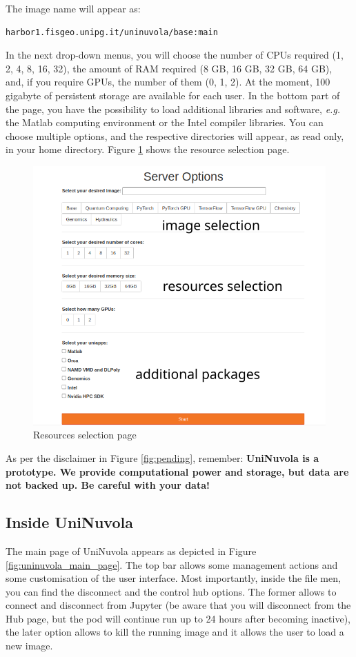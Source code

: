 The image name will appear as:
\begin{lstlisting}[language=bash] 
harbor1.fisgeo.unipg.it/uninuvola/base:main
\end{lstlisting}

In the next drop-down menus, you will choose the number of CPUs required (1, 2, 4, 8, 16, 32), the amount of RAM
required (8 GB, 16 GB, 32 GB, 64 GB), and, if you require GPUs, the number of them (0, 1, 2). At the moment, 100
gigabyte of persistent storage are available for each user. In the bottom part of the page, you have the possibility to load additional libraries and software, \textit{e.g.} the Matlab computing environment or the Intel compiler libraries. You can choose multiple options, and the respective directories will appear, as read only, in your home directory. Figure \ref{fig:resources} shows the resource selection page.\\

\begin{figure}[!ht]
    \centering
    \includegraphics[width=0.75\linewidth]{img/resource_selection.png}
    \caption{Resources selection page}
    \label{fig:resources}
\end{figure}

As per the disclaimer in Figure \ref{fig:pending}, remember: \textbf{UniNuvola is a prototype. We provide computational
    power and storage, but data are not backed up. Be careful with your data!} \\

\subsection{Inside UniNuvola}
The main page of UniNuvola appears as depicted in Figure \ref{fig:uninuvola_main_page}. The top bar allows some
management actions and some customisation of the user interface. Most importantly, inside the file men, you can find the
disconnect and  the control hub options. The former allows to connect and disconnect from Jupyter (be aware that you
will disconnect from the Hub page, but the pod will continue run up to 24 hours after becoming inactive), the later
option allows to kill the running image and it allows the user to load a new image. \\

